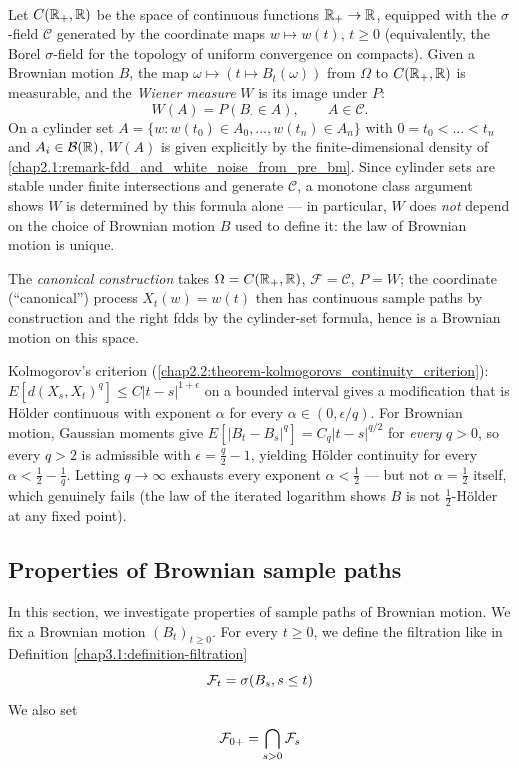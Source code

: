 \begin{definition} \label{chap2.2:definition-wiener_measure}  \\
Let $C(\mathbb{R}_+,\mathbb{R})$ be the space of continuous functions $\mathbb{R}_+\to\mathbb{R}$, equipped with the $\sigma$-field $\mathcal C$ generated by the coordinate maps $w\mapsto w(t)$, $t\ge0$ (equivalently, the Borel $\sigma$-field for the topology of uniform convergence on compacts). Given a Brownian motion $B$, the map $\omega\mapsto(t\mapsto B_t(\omega))$ from $\Omega$ to $C(\mathbb{R}_+,\mathbb{R})$ is measurable, and the \textit{Wiener measure} $W$ is its image under $P$:
$$W(A)=P(B_\cdot\in A), \qquad A\in\mathcal C.$$
On a cylinder set $A=\{w:w(t_0)\in A_0,\dots,w(t_n)\in A_n\}$ with $0=t_0<\dots<t_n$ and $A_i\in\mathcal B(\mathbb{R})$, $W(A)$ is given explicitly by the finite-dimensional density of \cref{chap2.1:remark-fdd_and_white_noise_from_pre_bm}. Since cylinder sets are stable under finite intersections and generate $\mathcal C$, a monotone class argument shows $W$ is determined by this formula alone --- in particular, $W$ does \emph{not} depend on the choice of Brownian motion $B$ used to define it: the law of Brownian motion is unique.

The \textit{canonical construction} takes $\Omega=C(\mathbb{R}_+,\mathbb{R})$, $\mathcal F=\mathcal C$, $P=W$; the coordinate (``canonical'') process $X_t(w)=w(t)$ then has continuous sample paths by construction and the right fdds by the cylinder-set formula, hence is a Brownian motion on this space.
\end{definition}
\begin{quizbox} Kolmogorov's criterion (\cref{chap2.2:theorem-kolmogorovs_continuity_criterion}): $E[d(X_s,X_t)^q]\le C|t-s|^{1+\epsilon}$ on a bounded interval gives a modification that is Hölder continuous with exponent $\alpha$ for every $\alpha\in(0,\epsilon/q)$. For Brownian motion, Gaussian moments give $E[|B_t-B_s|^q]=C_q|t-s|^{q/2}$ for \emph{every} $q>0$, so every $q>2$ is admissible with $\epsilon=\frac q2-1$, yielding Hölder continuity for every $\alpha<\frac12-\frac1q$. Letting $q\to\infty$ exhausts every exponent $\alpha<\frac12$ --- but not $\alpha=\frac12$ itself, which genuinely fails (the law of the iterated logarithm shows $B$ is not $\frac12$-Hölder at any fixed point).
\end{quizbox}

\subsection{Properties of Brownian sample paths}
In this section, we investigate properties of sample paths of Brownian motion. We fix a Brownian motion $(B_t)_{t \geq 0}$. For every $t \geq 0$, we define the filtration like in Definition \ref{chap3.1:definition-filtration}
$$\mathcal{F}_t=\sigma(B_s, s \leq t)$$
We also set
$$\mathcal{F}_{0+}=\bigcap_{s > 0}\mathcal{F}_s$$

